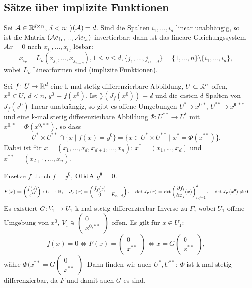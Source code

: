 \subsection{S\"atze \"uber implizite Funktionen}
Sei $ \mathcal A\in\mathbb{R}^{d\times n} $, $ d<n $; $ \rangle(\mathcal A)=d $. Sind die Spalten $ i_1,...,i_d $ linear unabh\"angig, so ist die Matrix $ (\mathcal A e_{i_1},...,\mathcal A e_{i_d}) $ invertierbar; dann ist das lineare Gleichungssystem $ Ax=0 $ nach $ x_{i_1},...,x_{i_d} $ l\"osbar:
\[ x_{i_\nu}=L_\nu(x_{j_1},...,x_{j_{n-d}}), 1\leq\nu\leq d,\lbrace j_1,...,j_{n-d}\rbrace=\lbrace 1,...,n\rbrace\setminus\lbrace i_1,...,i_d\rbrace,\]
wobei $ L_\nu $ Linearformen sind (implizite Funktionen).
\begin{satz}
	Sei $ f\colon U\rightarrow\mathbb{R}^d $ eine k-mal stetig differenzierbare Abbildung, $ U\subset\mathbb{R}^n $ offen, $ x^0\in U $, $ d<n $, $ y^0=f(x^0) $. Ist $ \rang(J_f(x^0))=d $ und die ersten $ d $ Spalten von $ J_f(x^0) $ linear unabh\"angig, so gibt es offene Umgebungen $ U^\ast\ni x^{0,\ast} $, $ U^{\ast\ast}\ni x^{0,\ast\ast} $ und eine k-mal stetig differenzierbare Abbildung $ \Phi\colon U^{\ast\ast}\rightarrow U^{\ast} $ mit $ x^{0,\ast}=\Phi(x^{0,\ast\ast}) $, so dass \[ U^\ast\times U^{\ast\ast}\cap\lbrace x\mid f(x)=y^0\rbrace=\lbrace x\in U^\ast\times U^{\ast\ast}\mid x^\ast=\Phi(x^{\ast\ast})\rbrace. \]
	Dabei ist f\"ur $ x=(x_1,...,x_d,x_{d+1},...,x_n) $: $ x^\ast=(x_1,...,x_d) $ und $ x^{\ast\ast}=(x_{d+1},...,x_n) $.
\end{satz}
\begin{beweis}
	Ersetze $ f $ durch $ f=y^0 $; OBdA $ y^0=0 $.
	\[ F(x)\coloneqq \begin{pmatrix}
	f(x)\\x^{\ast\ast}
	\end{pmatrix}\colon U\rightarrow\mathbb{R},\quad J_F(x)=\begin{pmatrix}
	J_f(x)&\\0&E_{n-d}
	\end{pmatrix},\quad \det J_F(x)=\det\left(\frac{\partial f_i}{\partial x_j}(x)\right)_{i,j=1}^d,\quad\det J_F(x^0)\neq 0 \]
	Es existiert $ G\colon V_1\rightarrow U_1 $ k-mal stetig differenzierbar Inverse zu $ F $, wobei $ U_1 $ offene Umgebung von $ x^0 $, $ V_1\ni \begin{pmatrix}
	0\\x^{0,\ast\ast}
	\end{pmatrix} $ offen. Es gilt f\"ur $ x\in U_1: $ \[ f(x)=0\Leftrightarrow F(x)= \begin{pmatrix}
	0\\x^{\ast\ast}
	\end{pmatrix}\Leftrightarrow x=G \begin{pmatrix}
	0\\ x^{\ast\ast}
	\end{pmatrix}, \]
	w\"ahle $ \Phi(x^{\ast\ast}=G \begin{pmatrix}
	0\\x^{\ast\ast}
	\end{pmatrix} $. Dann finden wir auch $ U^\ast, U^{\ast\ast} $; $ \Phi $ ist k-mal stetig differenzierbar, da $ F $ und damit auch $ G $ es sind.
\end{beweis}
